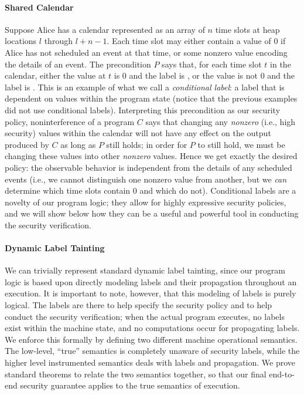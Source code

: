 \paragraph{Shared Calendar}
Suppose Alice has a calendar represented as an array of $n$ time slots at heap locations $l$ 
through $l+n-1$. Each time slot may either contain a value of $0$ if Alice has not scheduled an
event at that time, or some nonzero value encoding the details of an event. The 
precondition $P$ says that, for each time slot $t$ in the calendar, either the value at $t$
is $0$ and the label is \lo{}, or the value is not $0$ and the label is \hi{}. This is an 
example of what we call a \emph{conditional label}: a label that is dependent on values
within the program state (notice that the previous examples did not use conditional labels).
Interpreting this precondition as our security policy, noninterference of a program $C$ says 
that changing any \emph{nonzero} (i.e., high security) values within the calendar will not 
have any effect on the output produced by $C$ as long as $P$ still holds; in order for $P$ to 
still hold, we must be changing these values into other \emph{nonzero} values. Hence we
get exactly the desired policy: the observable behavior is independent from the details
of any scheduled events (i.e., we cannot distinguish one nonzero value from another, but
we \emph{can} determine which time slots contain $0$ and which do not). 
Conditional labels are a novelty of our program logic; they allow for highly expressive
security policies, and we will show below
how they can be a useful and powerful tool in conducting the security verification.

\paragraph{Dynamic Label Tainting}
We can trivially represent standard dynamic label tainting, since our program logic
is based upon directly modeling labels and their propagation throughout an execution.
It is important to note, however, that this modeling of labels is purely logical.
The labels are there to help specify the security policy and to help conduct the security
verification; when the actual program executes, no labels exist within the machine
state, and no computations occur for propagating labels. We enforce this formally
by defining two different machine operational semantics. The low-level, ``true'' semantics 
is completely unaware of security labels, while the higher level instrumented semantics
deals with labels and propagation. We prove standard theorems to relate the two semantics
together, so that our final end-to-end security guarantee applies to the true semantics
of execution.

